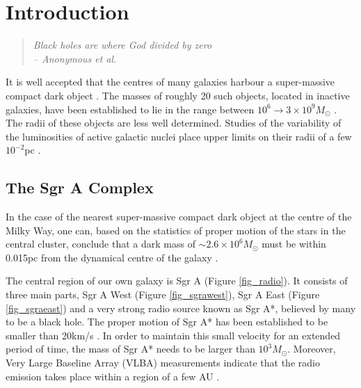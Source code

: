 \section{Introduction}
\begin{quotation}
	\raggedleft \it
	Black holes are where God divided by zero \\
	-- Anonymous et al.
\end{quotation}
It is well accepted that the centres of many galaxies harbour a super-massive compact dark object \cite{ref_centralobjects}.
The masses of roughly 20 such objects, located in inactive galaxies, have been established to lie in the range between
$10^6 \rightarrow 3\times 10^9M_\odot$ \cite{ref_centralobjectsbiggest}. The radii of these objects are less well determined.
Studies of the variability of the luminosities of active galactic nuclei place upper limits on their radii of a few $10^{-2}$pc
\cite{ref_centralobjects}.

\subsection{The Sgr A Complex}
In the case of the nearest super-massive compact dark object at the centre of the Milky Way, one can, based on the statistics of
proper motion of the stars in the central cluster, conclude that a dark mass of $\sim 2.6 \times 10^6 M_\odot$
must be within 0.015pc from the dynamical centre of the galaxy \cite{ref_ghezmotion}.

The central region of our own galaxy is Sgr A
(Figure \ref{fig_radio}). It consists of three main parts, Sgr A West (Figure \ref{fig_sgrawest}), Sgr A East (Figure \ref{fig_sgraeast})
and a very strong radio source known as Sgr A*, believed by many to be a black hole. The proper motion of Sgr A* has been established
to be smaller than 20km/s \cite{ref_radioproper}. In order to maintain this small velocity for an extended period of time, the mass of
Sgr A* needs to be larger than $10^3M_\odot$. Moreover, Very Large Baseline Array (VLBA) measurements indicate that the radio emission
takes place within a region of a few AU \cite{ref_vlba}.

